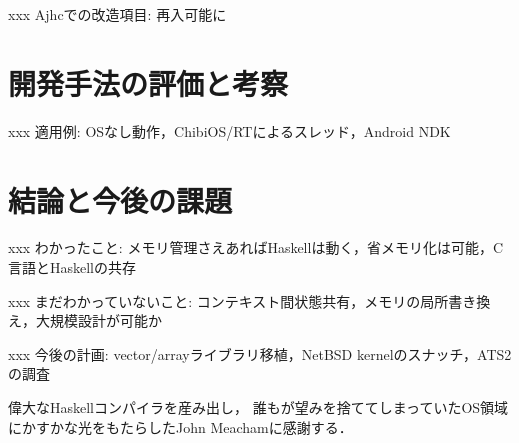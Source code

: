 \documentclass[submit,techreq,noauthor]{ipsj}
\begin{document}
xxx Ajhcでの改造項目: 再入可能に

\section{開発手法の評価と考察}

xxx 適用例: OSなし動作，ChibiOS/RTによるスレッド，Android NDK

\section{結論と今後の課題}

xxx わかったこと: メモリ管理さえあればHaskellは動く，省メモリ化は可能，C言語とHaskellの共存

xxx まだわかっていないこと: コンテキスト間状態共有，メモリの局所書き換え，大規模設計が可能か

xxx 今後の計画: vector/arrayライブラリ移植，NetBSD kernelのスナッチ，ATS2 \cite{ats} の調査

\begin{acknowledgment}
偉大なHaskellコンパイラを産み出し，
誰もが望みを捨ててしまっていたOS領域にかすかな光をもたらしたJohn Meachamに感謝する．
\end{acknowledgment}




\begin{biography}
\end{biography}
\end{document}
